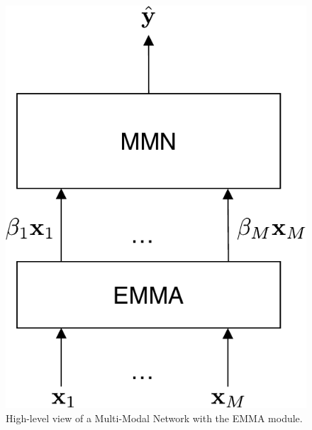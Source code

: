 \begin{figure}[!h]
\centering
\includegraphics[scale=0.5]{figures/mlp-with-emma}
\caption[High-level view of a Multi-Modal Network with EMMA]{High-level view of a Multi-Modal Network with the EMMA module.}	
\label{fig:mnn-with-emma}
\end{figure}


